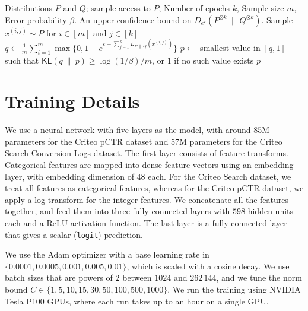 \documentclass[twoside]{article}
\theoremstyle{definition}
\newcommand{\eps}{\varepsilon}
\newcommand{\Deps}{D_{e^{\eps}}}
\newcommand{\KL}{\mathsf{KL}}
\begin{document}
\begin{algorithm}[t]
\caption{Monte Carlo Estimation of $\Deps(P^{\otimes k} ~\|~ Q^{\otimes k})$.}
\label{alg:mce-multiple-epochs}
\begin{algorithmic}
\REQUIRE Distributions $P$ and $Q$; sample access to $P$, Number of epochs $k$, Sample size $m$, Error probability $\beta$.
\ENSURE An upper confidence bound on $\Deps(P^{\otimes k} ~\|~ Q^{\otimes k})$.
\STATE Sample $x^{(i,j)} \sim P$ for $i \in [m]$ and $j \in [k]$
\STATE $q \gets \frac1m \sum_{i=1}^m \max\{ 0, 1 - e^{\eps - \sum_{j=1}^k L_{P ~\|~ Q}(x^{(i,j)})}\}$
\STATE $p \gets$ smallest value in $[q, 1]$ such that $\KL(q ~\|~ p) \ge \log(1/\beta) / m$, or $1$ if no such value exists
\RETURN $p$
\end{algorithmic}
\end{algorithm}

\section{Training Details} \label{app:training}
We use a neural network with five layers as the model, with around 85M parameters for the Criteo pCTR dataset and 57M parameters for the Criteo Search Conversion Logs dataset. The first layer consists of feature transforms. Categorical features are mapped into dense feature vectors using an embedding layer, with embedding dimension of $48$ each. For the Criteo Search dataset, we treat all features as categorical features, whereas for the Criteo pCTR dataset, we apply a log transform for the integer features. We concatenate all the features together, and feed them into three fully connected layers with $598$ hidden units each and a ReLU activation function. The last layer is a fully connected layer that gives a scalar (\texttt{logit}) prediction.

We use the Adam optimizer with a base learning rate in $\{0.0001, 0.0005, 0.001, 0.005, 0.01\}$, which is scaled with a cosine decay. We use batch sizes that are powers of $2$ between $1024$ and $262\,144$, and we tune the norm bound $C\in\{1, 5, 10, 15, 30, 50, 100, 500, 1000\}$. We run the training using NVIDIA Tesla P100 GPUs, where each run takes up to an hour on a single GPU.
\end{document}
